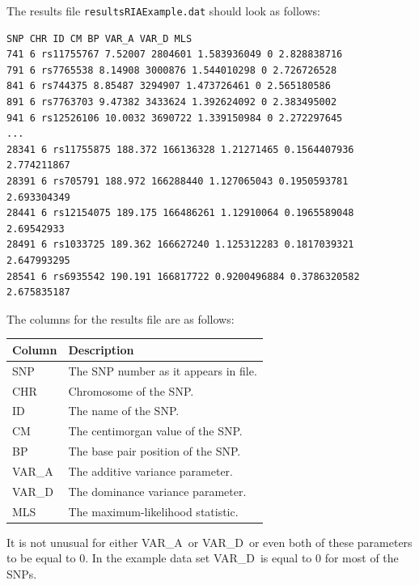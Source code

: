 \documentclass[a4paper,12pt]{article}
\newcommand{\code}[1]{{\footnotesize{{\tt #1}}}}
\begin{document}
The results file \code{resultsRIAExample.dat} should look as follows: 
\vspace{0.35cm} \begin{lstlisting}
SNP CHR ID CM BP VAR_A VAR_D MLS
741 6 rs11755767 7.52007 2804601 1.583936049 0 2.828838716
791 6 rs7765538 8.14908 3000876 1.544010298 0 2.726726528
841 6 rs744375 8.85487 3294907 1.473726461 0 2.565180586
891 6 rs7763703 9.47382 3433624 1.392624092 0 2.383495002
941 6 rs12526106 10.0032 3690722 1.339150984 0 2.272297645
...
28341 6 rs11755875 188.372 166136328 1.21271465 0.1564407936 2.774211867
28391 6 rs705791 188.972 166288440 1.127065043 0.1950593781 2.693304349
28441 6 rs12154075 189.175 166486261 1.12910064 0.1965589048 2.69542933
28491 6 rs1033725 189.362 166627240 1.125312283 0.1817039321 2.647993295
28541 6 rs6935542 190.191 166817722 0.9200496884 0.3786320582 2.675835187

\end{lstlisting} \vspace{0.35cm}
The columns for the results file are as follows: 

{\begin{center}\begin{tabular}{ll}
Column  & Description\\
\hline
SNP  & The SNP number as it appears in file.\\
CHR  & Chromosome of the SNP.\\
ID  & The name of the SNP.\\
CM  & The centimorgan value of the SNP.\\
BP  & The base pair position of the SNP.\\
VAR\_A & The additive variance parameter.\\
VAR\_D & The dominance variance parameter.\\
MLS  & The maximum-likelihood statistic.\\
\end{tabular}\end{center}}

It is not unusual for either VAR\_A~or VAR\_D~or even both of these parameters to be equal to 0. In the example data set VAR\_D~is equal to 0 for most of the SNPs. 
\end{document}
